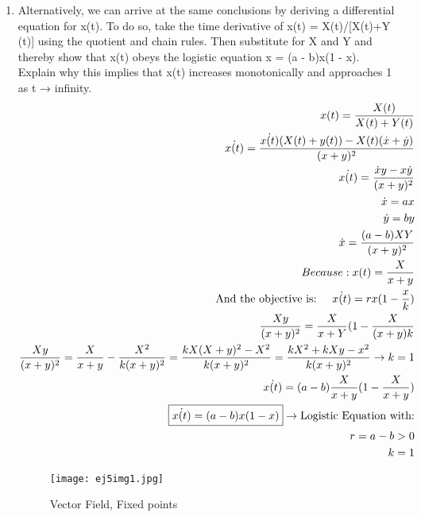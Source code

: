 \documentclass[a4paper,10pt]{article}
\begin{document}
\begin{enumerate}
\begin{enumerate}
            \newpage
        \item Alternatively, we can arrive at the same conclusions by deriving a differential equation for x(t). To do so, take the time derivative of x(t) = X(t)/[X(t)+Y (t)] using the quotient and chain rules. Then substitute for X and Y and thereby show that x(t) obeys the logistic equation x = (a - b)x(1 - x). Explain why this implies that x(t) increases monotonically and approaches 1 as t → infinity.
            \begin{equation}
                \begin{aligned}
                     x(t)= \frac{X(t)}{X(t)+ Y(t)}\\
                     \dot{x(t)}= \frac{\dot{x(t)}(X(t)+ y(t))- X(t)(\dot{x}+ \dot{y})}{(x + y)^2 }\\
                     \dot{x(t)}= \frac{\dot{x}y - x\dot{y}}{(x + y)^2}\\
                     \dot{x}= ax\\
                     \dot{y}= by\\
                     \dot{x}=\frac{(a-b)XY}{(x + y)^2}\\
                     Because: x(t)= \frac{X}{x+y}\\
                     \text{And the objective is:} \hspace{0.5cm}\dot{x(t)}=rx (1-\frac{x}{k})\\
                     \frac{Xy}{(x+y)^2}= \frac{X}{x+ Y}(1-\frac{X}{(x+y)k}\\
                     \frac{Xy}{(x+y)^2}=\frac{X}{x + y}- \frac{X^2}{k(x+y)^2}=\frac{kX(X + y)^2-X^2}{k(x+ y)^2}= \frac{kX^2+ kXy- x^2}{k(x+y)^2} \rightarrow k=1\\
                     \dot{x(t)}=(a-b)\frac{X}{x+y}(1-\frac{X}{x+y})\\
                     \boxed{\dot{x(t)}=(a-b)x(1-x)} \rightarrow \text{Logistic Equation with:}\\
                     r= a- b>0\\
                     k=1\\
                \end{aligned}
            \end{equation}
                \begin{figure}[h]
                    \centering
                    \texttt{[image: ej5img1.jpg]}
                    \caption{Vector Field, Fixed points}
                    \label{fig:mesh1}
                \end{figure}
                

\end{enumerate}
\end{enumerate}
\end{document}

